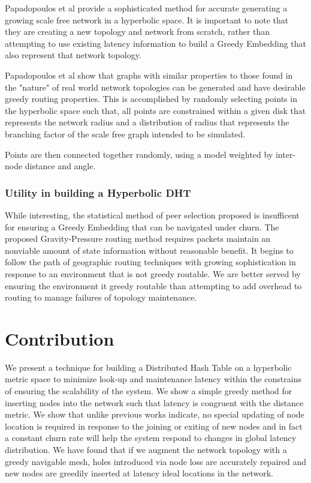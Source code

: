 Papadopoulos et al provide a sophisticated method for accurate generating a growing scale free network in a hyperbolic space. It is important to note that they are creating a new topology and network from scratch, rather than attempting to use existing latency information to build a Greedy Embedding that also represent that network topology.

Papadopoulos et al show that graphs with similar properties to those found in the "nature" of real world network topologies can be generated and have desirable greedy routing properties.
This is accomplished by randomly selecting points in the hyperbolic space such that, all points are constrained within a given disk that represents the network radius and a distribution of radius that represents the branching factor of the scale free graph intended to be simulated.

Points are then connected together randomly, using a model weighted by inter-node distance and angle.

\subsubsection{Utility in building a Hyperbolic DHT}

While interesting, the statistical method of peer selection proposed is insufficent for ensuring a Greedy Embedding that can be navigated under churn. The proposed Gravity-Pressure routing method requires packets maintain an nonviable amount of state information without reasonable benefit.
It begins to follow the path of geographic routing techniques with growing sophistication in response to an environment that is not greedy routable.
We are better served by ensuring the environment it greedy routable than attempting to add overhead to routing to manage failures of topology maintenance.




\section{Contribution}


We present a technique for building a Distributed Hash Table on a hyperbolic metric space to minimize  look-up and maintenance latency within the constrains of ensuring the scalability of the system.
We show a simple greedy method for inserting nodes into the network such that latency is congruent 
with the distance metric.
We show that unlike previous works indicate, no special updating of node location is required in response to the joining or exiting of new nodes and in fact a constant churn rate will help the system respond to changes in global latency distribution.
We have found that if we augment the network topology with a greedy navigable mesh, holes introduced via node loss are accurately repaired and new nodes are greedily inserted at latency ideal locations in the network.

